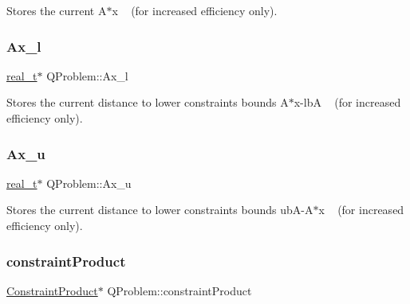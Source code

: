 Stores the current A$\ast$x ~\newline
(for increased efficiency only). \mbox{\label{class_q_problem_a79c7d319fdd782c617728eaf260d15c9}} 
\subsubsection{\texorpdfstring{Ax\+\_\+l}{Ax\_l}}
{\footnotesize\ttfamily \hyperlink{qp_o_a_s_e_s__wrapper_8h_a0d00e2b3dfadee81331bbb39068570c4}{real\+\_\+t}$\ast$ Q\+Problem\+::\+Ax\+\_\+l\hspace{0.3cm}{\ttfamily [protected]}}

Stores the current distance to lower constraints\textquotesingle{} bounds A$\ast$x-\/lbA ~\newline
(for increased efficiency only). \mbox{\label{class_q_problem_a0aed3f7b675010b4117c6e3cbc1a38e4}} 
\subsubsection{\texorpdfstring{Ax\+\_\+u}{Ax\_u}}
{\footnotesize\ttfamily \hyperlink{qp_o_a_s_e_s__wrapper_8h_a0d00e2b3dfadee81331bbb39068570c4}{real\+\_\+t}$\ast$ Q\+Problem\+::\+Ax\+\_\+u\hspace{0.3cm}{\ttfamily [protected]}}

Stores the current distance to lower constraints\textquotesingle{} bounds ub\+A-\/\+A$\ast$x ~\newline
(for increased efficiency only). \mbox{\label{class_q_problem_abea467ddb7e5129e3b48878e00d03689}} 
\subsubsection{\texorpdfstring{constraint\+Product}{constraintProduct}}
{\footnotesize\ttfamily \hyperlink{class_constraint_product}{Constraint\+Product}$\ast$ Q\+Problem\+::constraint\+Product\hspace{0.3cm}{\ttfamily [protected]}}

